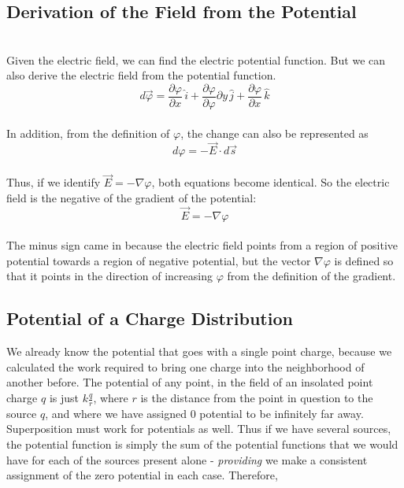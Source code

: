 \documentclass[svgnames]{article}
\begin{document}
\subsection{Derivation of the Field from the Potential}  \mbox{} \\ 

Given the electric field, we can find the electric potential function. But we can also derive the electric field from the potential function. \\

\[d\vec{\varphi} = \frac{\partial \varphi}{\partial x} \, \hat{i} + \frac{\partial \varphi}{\partial \varphi}{\partial y} \, \hat{j} + \frac{\partial \varphi}{\partial x} \, \hat{k} \] \\

In addition, from the definition of $\varphi$, the change can also be represented as \\

\[ d\varphi = - \vec{E} \cdot d\vec{s} \] \\

Thus, if we identify $\vec{E} = - \nabla \varphi$, both equations become identical. So the electric field is the negative of the gradient of the potential:\\

 \[ \vec{E} = - \nabla \varphi \] \\
 
 The minus sign came in because the electric field points from a region of positive potential towards a region of negative potential, but the vector $\nabla \varphi$ is defined so that it points in the direction of increasing $\varphi$ from the definition of the gradient. \\
 
 \subsection{Potential of a Charge Distribution}
 
 We already know the potential that goes with a single point charge, because we calculated the work required to bring one charge into the neighborhood of another before. The potential of any point, in the field of an insolated point charge $q$ is just $k\frac{q}{r}$, where $r$ is the distance from the point in question to the source $q$, and where we have assigned 0 potential to be infinitely far away.  \\
 
 Superposition must work for potentials as well. Thus if we have several sources, the potential function is simply the sum of the potential functions that we would have for each of the sources present alone - \textit{providing} we make a consistent assignment of the zero potential in each case. Therefore, 
 
\end{document}
